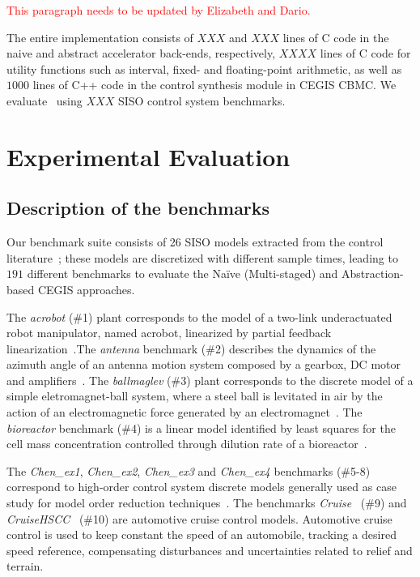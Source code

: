 \documentclass[twocolumn]{autart}    %
\begin{document}
\textcolor{red}{This paragraph needs to be updated by Elizabeth and Dario.}

The entire implementation consists of $XXX$ and $XXX$ lines of C code in the naive and abstract
accelerator back-ends, respectively, $XXXX$ lines of C code for utility functions such as interval, 
fixed- and floating-point arithmetic, as well as $1000$ lines of C++ code in the control synthesis
module in CEGIS CBMC.  We evaluate \tool~using $XXX$ SISO control system
benchmarks.

\section{Experimental Evaluation}
\label{exp:evaluation}

\subsection{Description of the benchmarks}
\label{exp:benchmarks}


Our benchmark suite consists of 26 SISO models extracted from the 
control literature~\cite{acrobot,cstr,CHEN1979389,KOKOTOVIC198023,gajic2008optimal,Franklin15, maglev, converters, CTMS, gajic2008optimal};
these models are discretized with different sample times, leading to $191$ different benchmarks
to evaluate the Na\"ive (Multi-staged) and Abstraction-based CEGIS approaches.

The \textit{acrobot} (\#1) plant corresponds to the model of a two-link 
underactuated robot manipulator, named acrobot, linearized by partial 
feedback linearization~\cite{acrobot}.The \textit{antenna} benchmark (\#2) 
describes the dynamics of the azimuth angle of an antenna 
motion system composed by a gearbox, DC motor and amplifiers~\cite{gajic2008optimal}. 
The \textit{ballmaglev} (\#3) plant corresponds to the discrete model of a simple 
eletromagnet-ball system, where a steel ball is levitated in air by the action 
of an electromagnetic force generated by an electromagnet~\cite{Franklin15}. 
The \textit{bioreactor} benchmark (\#4) is a linear model identified by least squares 
for the cell mass concentration controlled through dilution rate of a 
bioreactor~\cite{bioreactor}.

The \textit{Chen\_ex1}, \textit{Chen\_ex2}, \textit{Chen\_ex3} and \textit{Chen\_ex4} 
benchmarks (\#5-8) correspond to high-order control system discrete models generally used as 
case study for model order reduction techniques~\cite{CHEN1979389}. The benchmarks 
\textit{Cruise}~\cite{Franklin15} (\#9) and \textit{CruiseHSCC}~\cite{Astrom08} (\#10) are 
automotive cruise control models. Automotive cruise control is used to keep 
constant the speed of an automobile, tracking a desired speed reference, 
compensating disturbances and uncertainties related to relief and terrain.
\end{document}
